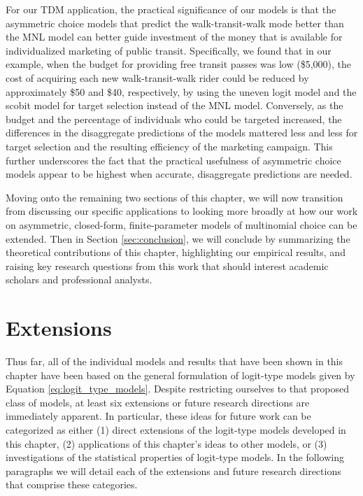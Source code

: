 For our TDM application, the practical significance of our models is that the asymmetric choice models that predict the walk-transit-walk mode better than the MNL model can better guide investment of the money that is available for individualized marketing of public transit. Specifically, we found that in our example, when the budget for providing free transit passes was low (\$5,000), the cost of acquiring each new walk-transit-walk rider could be reduced by approximately \$50 and \$40, respectively, by using the uneven logit model and the scobit model for target selection instead of the MNL model. Conversely, as the budget and the percentage of individuals who could be targeted increased, the differences in the disaggregate predictions of the models mattered less and less for target selection and the resulting efficiency of the marketing campaign. This further underscores the fact that the practical usefulness of  asymmetric choice models appear to be highest when accurate, disaggregate predictions are needed.

Moving onto the remaining two sections of this chapter, we will now transition from discussing our specific applications to looking more broadly at how our work on asymmetric, closed-form, finite-parameter models of multinomial choice can be extended. Then in Section \ref{sec:conclusion}, we will conclude by summarizing the theoretical contributions of this chapter, highlighting our empirical results, and raising key research questions from this work that should interest academic scholars and professional analysts.

\section{Extensions}
\label{sec:extensions}
Thus far, all of the individual models and results that have been shown in this chapter have been based on the general formulation of logit-type models given by Equation \ref{eq:logit_type_models}. Despite restricting ourselves to that proposed class of models, at least six extensions or future research directions are immediately apparent. In particular, these ideas for future work can be categorized as either (1) direct extensions of the logit-type models developed in this chapter, (2) applications of this chapter's ideas to other models, or (3) investigations of the statistical properties of logit-type models. In the following paragraphs we will detail each of the extensions and future research directions that comprise these categories.

